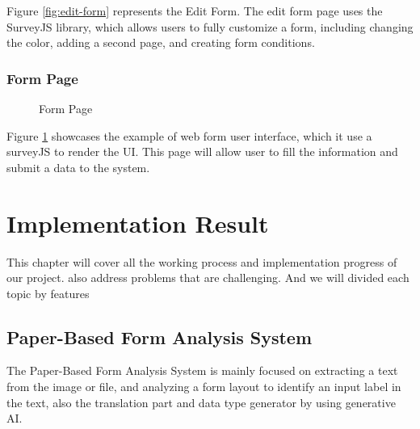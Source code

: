 \documentclass[12pt,oneside,openright,a4paper]{cpe-english-project}
\begin{document}
Figure \ref{fig:edit-form}  represents the Edit Form. The edit form page uses the SurveyJS library, which allows users to fully customize a form, including changing the color, adding a second page, and creating form conditions.

\subsection{Form Page}

\begin{figure}[!h]
\centering
{}
\caption{Form Page}\label{fig:form-page}
\end{figure}

Figure \ref{fig:form-page} showcases the example of web form user interface, which it use a surveyJS to render the UI. This  page will allow user to fill the information and submit a data to the system.


\chapter{Implementation Result}

This chapter will cover all the working process and implementation progress of our project. also address problems that are challenging. And we will divided each topic by features

\section{Paper-Based Form Analysis System}

The Paper-Based Form Analysis System is mainly focused on extracting a text from the image or file, and analyzing a form layout to identify an input label in the text, also the translation part and data type generator by using generative AI.
\end{document}
